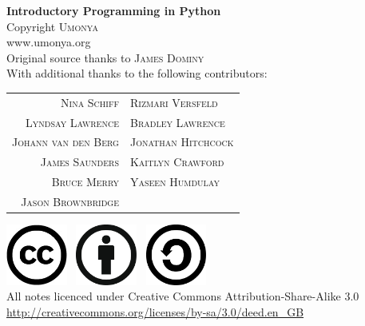 \begin{titlepage}
\begin{center}
{ \huge \bfseries Introductory Programming in Python } \\[5cm]
{\LARGE Copyright \textsc{Umonya}\\
www.umonya.org }\\[1cm]

Original source thanks to \textsc{James Dominy} \\[0.5cm]
With additional thanks to the following contributors: \\[0.5cm]
\begin{tabular}{r l}
\textsc{Nina Schiff} & \textsc{Rizmari Versfeld}\\
\textsc{Lyndsay Lawrence} & \textsc{Bradley Lawrence}\\
\textsc{Johann van den Berg} & \textsc{Jonathan Hitchcock} \\
\textsc{James Saunders} & \textsc{Kaitlyn Crawford} \\
\textsc{Bruce Merry} & \textsc{Yaseen Humdulay} \\
\textsc{Jason Brownbridge} & \\
\end{tabular}
\vfill

\includegraphics[width=0.15\textwidth]{./cc-logo.jpg}~
\includegraphics[width=0.15\textwidth]{./attribution-by.png}~
\includegraphics[width=0.15\textwidth]{./share-alike-sa.png}~ \\[0.5cm]
{\large All notes licenced under Creative Commons Attribution-Share-Alike 3.0 } \\
{\large \url{http://creativecommons.org/licenses/by-sa/3.0/deed.en_GB} }\\
\end{center}
\end{titlepage}

